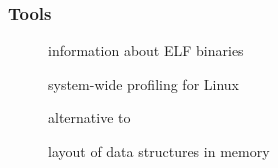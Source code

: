 \begin{frame}
 \frametitle{Tools}
 \begin{description}
  \item[] information about ELF binaries
  \item[] system-wide profiling for Linux
  \item[] alternative to 
  \item[] layout of data structures in memory
 \end{description}
\end{frame}
